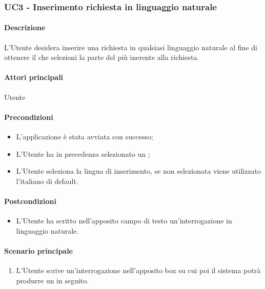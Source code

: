 \subsubsection{UC3 - Inserimento richiesta in linguaggio naturale}\label{UC3}
\paragraph*{Descrizione}
L’Utente desidera inserire una richiesta in qualsiasi linguaggio naturale al fine di ottenere il  che selezioni la parte del  più inerente alla richiesta. 

\paragraph*{Attori principali}
Utente

\paragraph*{Precondizioni}
\begin{itemize}
  \item L'applicazione è stata avviata con successo;
  \item L’Utente ha in precedenza selezionato un ; 
  \item L'Utente seleziona la lingua di inserimento, se non selezionata viene utilizzato l'italiano di default.
\end{itemize}

\paragraph*{Postcondizioni}
\begin{itemize}
  \item L’Utente ha scritto nell’apposito campo di testo un'interrogazione in linguaggio naturale.
\end{itemize}

\paragraph*{Scenario principale}
\begin{enumerate}
  \item L’Utente scrive un'interrogazione nell’apposito box su cui poi il sistema potrà produrre un  in seguito.
\end{enumerate}
